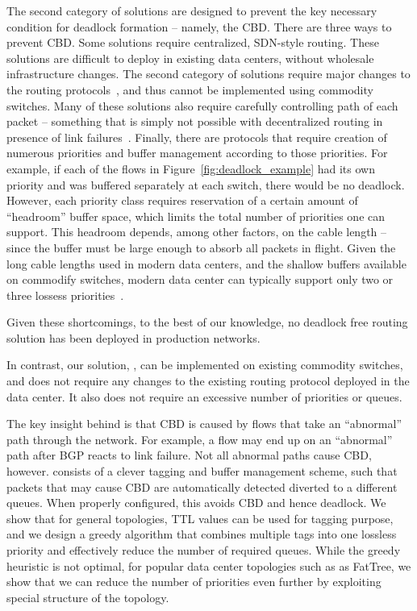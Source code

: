 The second category of solutions are designed to prevent the key necessary
condition for deadlock formation -- namely, the CBD. There are three ways to
prevent CBD.  Some solutions require centralized, SDN-style routing.  These
solutions are difficult to deploy in existing data centers, without wholesale
infrastructure changes.  The second category of solutions require major changes
to the routing protocols~\cite{xxx}, and thus cannot be implemented using
commodity switches. Many of these solutions also require carefully controlling
path of each packet -- something that is simply not possible with decentralized
routing in presence of link failures~\cite{netpilot}.  Finally, there are
protocols that require creation of numerous priorities and buffer management
according to those priorities. For example, if each of the flows in
Figure~\ref{fig:deadlock_example} had its own priority and was buffered separately at each
switch, there would be no deadlock. However, each
priority class requires reservation of a certain amount of ``headroom'' buffer
space, which limits the total number of priorities one can support. This
headroom depends, among other factors, on the cable length -- since the buffer
must be large enough to absorb all packets in flight.  Given the long cable
lengths used in modern data centers, and the shallow buffers available on
commodify switches, modern data center can typically support only two or three
lossess priorities~\cite{rdmaatscale}.

Given these shortcomings, to the best of our knowledge, no deadlock free routing
solution has been deployed in production networks. 

In contrast, our solution, \sysname{}, can be implemented on existing commodity
switches, and does not require any changes to the existing routing protocol
deployed in the data center. It also does not require an excessive number of
priorities or queues.

The key insight behind \sysname{} is that CBD is caused by flows that take an
``abnormal'' path through the network. For example, a flow may end up on an
``abnormal'' path after BGP reacts to link failure. Not all abnormal paths cause
CBD, however. \sysname{} consists of a clever tagging and buffer management
scheme, such that packets that may cause CBD are automatically detected diverted
to a different queues. When properly configured, this avoids CBD and hence
deadlock. We show that for general topologies, TTL values can be used for
tagging purpose, and we design a greedy algorithm that combines multiple tags
into one lossless priority and effectively reduce the number of required queues.
While the greedy heuristic is not optimal, for popular data center topologies
such as as FatTree, we show that we can reduce the number of priorities even
further by exploiting special structure of the topology.

